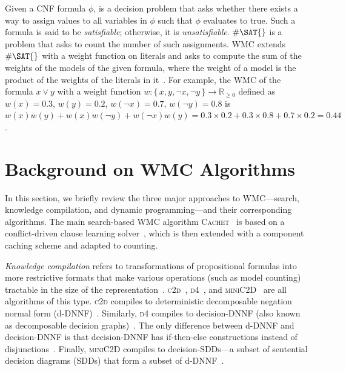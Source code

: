 \documentclass[runningheads]{llncs}
\begin{document}
Given a CNF formula $\phi$, \SAT{} is a decision problem that asks whether there
exists a way to assign values to all variables in $\phi$ such that $\phi$
evaluates to true. Such a formula is said to be \emph{satisfiable}; otherwise,
it is \emph{unsatisfiable}. $\#\SAT{}$ is a problem that asks to count the
number of such assignments. \textsf{WMC} extends $\#\SAT{}$ with a weight
function on literals and asks to compute the sum of the weights of the models of
the given formula, where the weight of a model is the product of the weights of
the literals in it~\cite{DBLP:journals/ai/ChaviraD08}. For example, the
\textsf{WMC} of the formula $x \lor y$ with a weight function $w\colon \{\,x, y,
\neg x, \neg y\,\} \to \mathbb{R}_{\ge 0}$ defined as $w(x) = 0.3$, $w(y) = 0.2$,
$w(\neg x) = 0.7$, $w(\neg y) = 0.8$ is $w(x)w(y)+w(x)w(\neg y)+w(\neg x)w(y) =
0.3 \times 0.2 + 0.3 \times 0.8 + 0.7 \times 0.2 = 0.44$.

\section{Background on \textsf{\textmd{WMC}} Algorithms}\label{sec:background}

In this section, we briefly review the three major approaches to
\textsf{WMC}---search, knowledge compilation, and dynamic programming---and
their corresponding algorithms. The main search-based \textsf{WMC} algorithm
\textsc{Cachet}~\cite{DBLP:conf/sat/SangBBKP04} is based on a conflict-driven
clause learning \SAT{} solver~\cite{DBLP:conf/dac/MoskewiczMZZM01}, which is
then extended with a component caching scheme and adapted to counting.

\emph{Knowledge compilation} refers to transformations of propositional formulas
into more restrictive formats that make various operations (such as model
counting) tractable in the size of the
representation~\cite{DBLP:journals/jair/DarwicheM02}.
\textsc{c2d}~\cite{DBLP:conf/ecai/Darwiche04},
\textsc{d4}~\cite{DBLP:conf/ijcai/LagniezM17}, and
\textsc{miniC2D}~\cite{DBLP:conf/ijcai/OztokD15} are all algorithms of this
type. \textsc{c2d} compiles to deterministic decomposable negation normal form
(d-DNNF)~\cite{DBLP:journals/jancl/Darwiche01}. Similarly, \textsc{d4} compiles
to decision-DNNF (also known as decomposable decision
graphs)~\cite{DBLP:conf/aaai/FargierM06}. The only difference between d-DNNF and
decision-DNNF is that decision-DNNF has if-then-else constructions instead of
disjunctions~\cite{DBLP:conf/ijcai/LagniezM17}. Finally, \textsc{miniC2D}
compiles to decision-SDDs---a subset of sentential decision diagrams (SDDs) that
form a subset of d-DNNF~\cite{DBLP:conf/ijcai/Darwiche11}.
\end{document}
